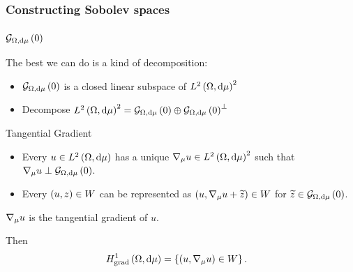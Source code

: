 \documentclass{beamer}
\begin{document}
\begin{frame}
	\frametitle{Constructing Sobolev spaces}
	
	
\end{frame}

\begin{frame}
	\frametitle{$\mathcal{G}_{ \Omega, \mathrm{d}\mu}\left( 0 \right)$}
	
	The best we can do is a kind of decomposition:
	\begin{itemize}
		\item $\mathcal{G}_{ \Omega, \mathrm{d}\mu}\left( 0 \right)$ is a closed linear subspace of $L^{2}\left( \Omega,\mathrm{d}\mu \right)^2$
		\item Decompose $L^{2}\left( \Omega,\mathrm{d}\mu \right)^2 = \mathcal{G}_{ \Omega, \mathrm{d}\mu}\left( 0 \right) \oplus \mathcal{G}_{ \Omega, \mathrm{d}\mu}\left( 0 \right)^{\perp}$
	\end{itemize}
	
	\begin{block}{Tangential Gradient}
		\begin{itemize}
			\item Every $u\in L^{2}\left( \Omega,\mathrm{d}\mu \right)$ has a unique $\nabla_{\mu}u\in L^{2}\left( \Omega,\mathrm{d}\mu \right)^2$ such that $\nabla_{\mu}u \perp \mathcal{G}_{ \Omega, \mathrm{d}\mu}\left( 0 \right)$.
			\item Every $\left( u,z \right)\in W$ can be represented as $\left( u,\nabla_{\mu}u + \widetilde{z} \right)\in W$ for $\widetilde{z}\in\mathcal{G}_{ \Omega, \mathrm{d}\mu}\left( 0 \right)$.	
		\end{itemize}
		$\nabla_{\mu}u$ is the tangential gradient of $u$.
	\end{block}
	Then
	\begin{align*}
		H^1_\mathrm{grad}\left( \Omega, \mathrm{d}\mu \right) &= \left\{ \left( u,\nabla_{\mu}u \right)\in W \right\}.
	\end{align*}

\end{frame}
\end{document}
